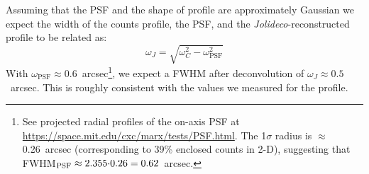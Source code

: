 \documentclass[twocolumn]{aastex631}
\newcommand{\chandra}{\textit{Chandra}~}
\newcommand{\xmm}{\textit{XMM}~}
\newcommand{\jolideconospace}{\textit{Jolideco}}
\begin{document}
    Assuming that the PSF and the shape of profile are approximately Gaussian we expect the width of the counts profile, the PSF, and the \jolideconospace-reconstructed profile to be related as:
    \begin{equation}
        \omega_{J} = \sqrt{\omega_C^2 - \omega_{\mathrm{PSF}}^2}
    \end{equation}
    With $\omega_{\mathrm{PSF}}\approx0.6$~arcsec\footnote{See projected radial profiles of the on-axis PSF at \url{https://space.mit.edu/cxc/marx/tests/PSF.html}.  The 1$\sigma$ radius is $\approx$0.26~arcsec (corresponding to 39\% enclosed counts in 2-D), suggesting that FWHM$_{{\rm PSF}}\approx{2.355{\cdot}0.26=0.62}$~arcsec.}, we expect a FWHM after deconvolution of $\omega_J\approx0.5$~arcsec. This is roughly consistent with the values we measured for the profile.
    

        
\end{document}
